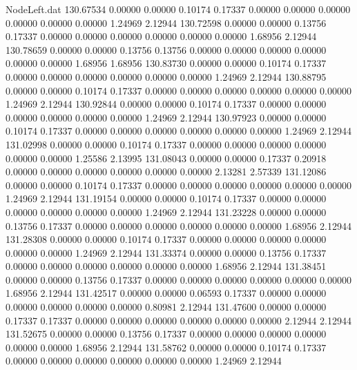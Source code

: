 \begin{filecontents}{NodeLeft.dat}
 130.67534    0.00000    0.00000     0.10174    0.17337    0.00000    0.00000    0.00000    0.00000    0.00000    0.00000    1.24969    2.12944
 130.72598    0.00000    0.00000     0.13756    0.17337    0.00000    0.00000    0.00000    0.00000    0.00000    0.00000    1.68956    2.12944
 130.78659    0.00000    0.00000     0.13756    0.13756    0.00000    0.00000    0.00000    0.00000    0.00000    0.00000    1.68956    1.68956
 130.83730    0.00000    0.00000     0.10174    0.17337    0.00000    0.00000    0.00000    0.00000    0.00000    0.00000    1.24969    2.12944
 130.88795    0.00000    0.00000     0.10174    0.17337    0.00000    0.00000    0.00000    0.00000    0.00000    0.00000    1.24969    2.12944
 130.92844    0.00000    0.00000     0.10174    0.17337    0.00000    0.00000    0.00000    0.00000    0.00000    0.00000    1.24969    2.12944
 130.97923    0.00000    0.00000     0.10174    0.17337    0.00000    0.00000    0.00000    0.00000    0.00000    0.00000    1.24969    2.12944
 131.02998    0.00000    0.00000     0.10174    0.17337    0.00000    0.00000    0.00000    0.00000    0.00000    0.00000    1.25586    2.13995
 131.08043    0.00000    0.00000     0.17337    0.20918    0.00000    0.00000    0.00000    0.00000    0.00000    0.00000    2.13281    2.57339
 131.12086    0.00000    0.00000     0.10174    0.17337    0.00000    0.00000    0.00000    0.00000    0.00000    0.00000    1.24969    2.12944
 131.19154    0.00000    0.00000     0.10174    0.17337    0.00000    0.00000    0.00000    0.00000    0.00000    0.00000    1.24969    2.12944
 131.23228    0.00000    0.00000     0.13756    0.17337    0.00000    0.00000    0.00000    0.00000    0.00000    0.00000    1.68956    2.12944
 131.28308    0.00000    0.00000     0.10174    0.17337    0.00000    0.00000    0.00000    0.00000    0.00000    0.00000    1.24969    2.12944
 131.33374    0.00000    0.00000     0.13756    0.17337    0.00000    0.00000    0.00000    0.00000    0.00000    0.00000    1.68956    2.12944
 131.38451    0.00000    0.00000     0.13756    0.17337    0.00000    0.00000    0.00000    0.00000    0.00000    0.00000    1.68956    2.12944
 131.42517    0.00000    0.00000     0.06593    0.17337    0.00000    0.00000    0.00000    0.00000    0.00000    0.00000    0.80981    2.12944
 131.47600    0.00000    0.00000     0.17337    0.17337    0.00000    0.00000    0.00000    0.00000    0.00000    0.00000    2.12944    2.12944
 131.52675    0.00000    0.00000     0.13756    0.17337    0.00000    0.00000    0.00000    0.00000    0.00000    0.00000    1.68956    2.12944
 131.58762    0.00000    0.00000     0.10174    0.17337    0.00000    0.00000    0.00000    0.00000    0.00000    0.00000    1.24969    2.12944

\end{filecontents}
